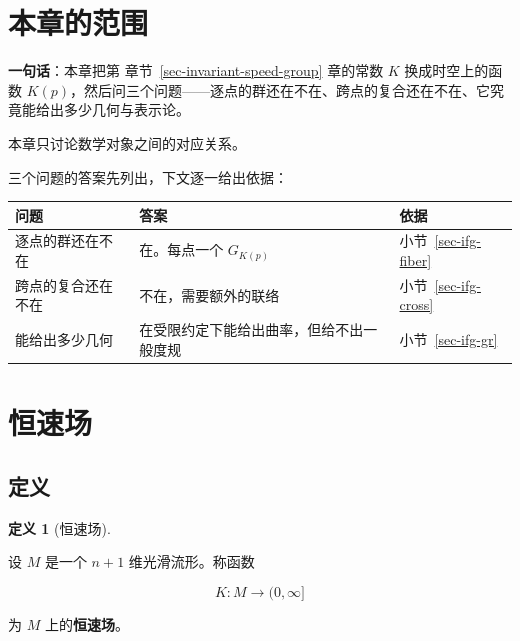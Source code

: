 \documentclass[
  chinese,
  a4paper,
  UTF8,
  12pt,
  oneside,
  openany]{ctexbook}
\newcounter{none} %
\theoremstyle{plain}
\theoremstyle{plain}
\theoremstyle{plain}
\theoremstyle{definition}
\newtheorem{definition}{定义}[chapter]
\theoremstyle{plain}
\theoremstyle{plain}
\theoremstyle{remark}
\begin{document}
\section{本章的范围}\label{sec-ifg-scope}

\textbf{一句话}：本章把第 章节~\ref{sec-invariant-speed-group} 章的常数
\(K\) 换成时空上的函数
\(K(p)\)，然后问三个问题------逐点的群还在不在、跨点的复合还在不在、它究竟能给出多少几何与表示论。

本章只讨论数学对象之间的对应关系。

三个问题的答案先列出，下文逐一给出依据：

{\def\LTcaptype{none} %
\begin{longtable}[]{@{}
  >{\raggedright\arraybackslash}p{}
  >{\raggedright\arraybackslash}p{}
  >{\raggedright\arraybackslash}p{}@{}}
\toprule\noalign{}
\begin{minipage}[b]{\linewidth}\raggedright
问题
\end{minipage} & \begin{minipage}[b]{\linewidth}\raggedright
答案
\end{minipage} & \begin{minipage}[b]{\linewidth}\raggedright
依据
\end{minipage} \\
\midrule\noalign{}
\endhead
\bottomrule\noalign{}
\endlastfoot
逐点的群还在不在 & 在。每点一个 \(G_{K(p)}\) &
小节~\ref{sec-ifg-fiber} \\
跨点的复合还在不在 & 不在，需要额外的联络 & 小节~\ref{sec-ifg-cross} \\
能给出多少几何 & 在受限约定下能给出曲率，但给不出一般度规 &
小节~\ref{sec-ifg-gr} \\
\end{longtable}
}

\section{恒速场}\label{sec-ifg-field}

\subsection{定义}\label{ux5b9aux4e49}

\begin{definition}[恒速场]\protect\hypertarget{def-ifg-field}{}\label{def-ifg-field}

设 \(M\) 是一个 \(n+1\) 维光滑流形。称函数

\[
K:M\longrightarrow(0,\infty]
\]

为 \(M\) 上的\textbf{恒速场}。

\end{definition}
\end{document}
